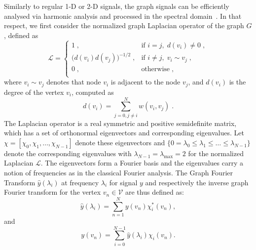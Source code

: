 \documentclass[10pt,journal,compsoc]{IEEEtran}
\begin{document}
	Similarly to regular 1-D or 2-D signals, the graph signals can be efficiently analysed via harmonic analysis and processed in the spectral domain~\cite{bb:shuman2013emerging}. In that respect, we first consider the normalized graph Laplacian operator of the graph $G$, defined as
			\begin{equation}
	\mathcal{L} =
	\begin{cases}
	1\;,  & \mbox{if } i = j, \; d(v_i) \neq 0 \;, \\
	\big(d(v_i) d(v_j)\big)^{-1/2}\;, &  \mbox{if } i \neq j, \; v_i \sim v_j \;, \\
	0\;, &  \mbox{otherwise}\;, \\
	\end{cases}
	\label{eq:laplacian}
	\end{equation}
	\noindent
	where $v_i \sim v_j$ denotes that node $v_i$ is adjacent to the node $v_j$, and $d(v_i)$ is the degree of the vertex $v_i$, computed as
	\begin{equation}
	d(v_i) = \sum_{j=0, j \neq i}^N w(v_i, v_j)\;.
	\end{equation}
	The Laplacian operator is a real symmetric and positive semidefinite matrix, which has a set of orthonormal eigenvectors and corresponding eigenvalues. Let $\chi=[\chi_0, \chi_1, \dots, \chi_{N-1}]$ denote these eigenvectors and $\{0=\lambda_0 \leq \lambda_1\leq \dots \leq \lambda_{N-1} \}$ denote the corresponding eigenvalues with $\lambda_{N-1} = \lambda_{\mathrm{max}} = 2$ for the normalized Laplacian $\mathcal{L}$. The eigenvectors form a Fourier basis and the eigenvalues carry a notion of frequencies as in the classical Fourier analysis. The Graph Fourier Transform $\hat{y}(\lambda_i)$ at frequency $\lambda_i$ for signal $y$ and respectively the inverse graph Fourier transform for the vertex $v_n \in \mathcal{V}$ are thus defined as:
	\begin{equation}
	\hat{y}(\lambda_i) = \sum_{n=1}^{N} y(v_n) \chi_i^*(v_n),
	\end{equation}
	and
	\begin{equation}
	y(v_n) = \sum_{i=0}^{N-1} \hat{y}(\lambda_i) \chi_i(v_n).
	\end{equation}
	\noindent
\end{document}
